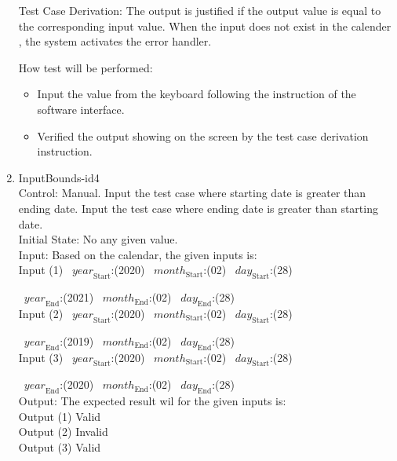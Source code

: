\documentclass[12pt, titlepage]{article}
\begin{document}
\begin{enumerate}

Test Case Derivation: The output is justified if the output value is equal to
the corresponding input value. When the input does not exist in the calender
, the system activates the error handler. \\


How test will be performed:
\begin{itemize} 
\item Input the value from the keyboard following the instruction of the
software interface. 
\item Verified the output showing on the screen by the test case derivation
 instruction. 
\end{itemize}

\item{InputBounds-id4\\}
Control: Manual. Input the test case where starting date is greater than ending date. Input
the test case where ending date is greater than starting date.\\
 
Initial State: No any given value.\\
Input: Based on the calendar, the given inputs is:\\ 
Input (1)
~$\mathit{year}_\text{Start}$:(2020)
~$\mathit{month}_\text{Start}$:(02) ~$\mathit{day}_\text{Start}$:(28)

~$\mathit{year}_\text{End}$:(2021)
~$\mathit{month}_\text{End}$:(02) ~$\mathit{day}_\text{End}$:(28)\\

Input (2) ~$\mathit{year}_\text{Start}$:(2020)
~$\mathit{month}_\text{Start}$:(02) ~$\mathit{day}_\text{Start}$:(28)

~$\mathit{year}_\text{End}$:(2019)
~$\mathit{month}_\text{End}$:(02) ~$\mathit{day}_\text{End}$:(28)\\

Input (3) ~$\mathit{year}_\text{Start}$:(2020)
~$\mathit{month}_\text{Start}$:(02) ~$\mathit{day}_\text{Start}$:(28)

~$\mathit{year}_\text{End}$:(2020)
~$\mathit{month}_\text{End}$:(02) ~$\mathit{day}_\text{End}$:(28)\\

Output: The expected result wil for the given inputs is:\\ 
Output (1) Valid\\ 
Output (2) Invalid\\
Output (3) Valid\\ 


\end{enumerate}
\end{document}
